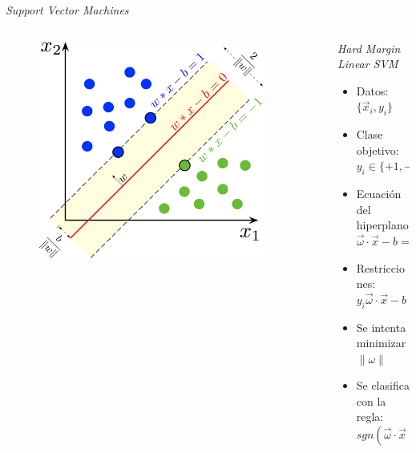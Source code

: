 \documentclass[11pt]{beamer}
\begin{document}
\begin{frame}{\textit{Support Vector Machines}}
\begin{columns}[T]
    \begin{column}{0.40\textwidth}
    \begin{figure}
        \centering
        \includegraphics[width=0.9\textwidth]{images/SVM_margin.png}
        \label{fig:svm_margin}
    \end{figure}
    \end{column}
    
\begin{column}{0.6\textwidth}
\textit{Hard Margin Linear SVM}
\begin{itemize}
    \item Datos: $\{ \vec{x}_i,y_i\}$
    \item Clase objetivo: $y_i \in \{+1, -1\}$
    \item Ecuaci\'on del hiperplano
    $\vec{\omega} \cdot \vec{x} - b = 0$
    \item Restricciones: $y_i \vec{\omega} \cdot \vec{x} - b \geq 1$
    \item Se intenta minimizar $\|\omega\|$
    \item Se clasifica con la regla: $$sgn(\vec{\omega} \cdot \vec{x} - b)$$
\end{itemize}
\end{column}
\end{columns}    
\end{frame}
\end{document}
